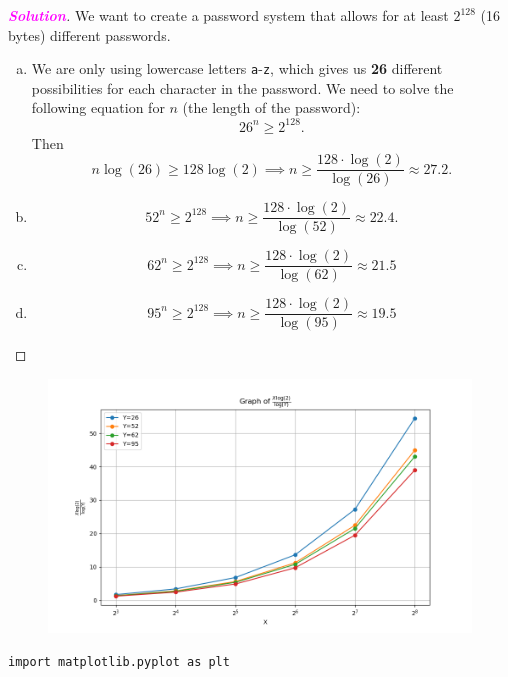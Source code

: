 \documentclass[12pt,openany]{book}
\theoremstyle{definition}
\newcommand{\sol}{\textcolor{magenta}{\bf Solution}}
\begin{document}
\begin{itemize}
\begin{enumerate}[(a)]
\begin{figure}[h!]
			\end{figure}
		\end{enumerate}
			\begin{proof}[\sol]
				We want to create a password system that allows for at least \(2^{128}\) (16 bytes) different passwords.
				\begin{enumerate}[(a)]
					\item We are only using lowercase letters \textcolor{red!70!black}{\texttt{a}}-\textcolor{red!70!black}{\texttt{z}}, which gives us \textbf{26} different possibilities for each character in the password. We need to solve the following equation for 
					\(n\) (the length of the password): \[
					26^n\geq 2^{128}.
					\] Then \[
					n\log(26)\geq 128\log(2)\implies n\geq\frac{128\cdot\log(2)}{\log(26)}\approx 27.2.
					\]
					\item \[
					52^n\geq 2^{128}\implies
					n\geq\frac{128\cdot\log(2)}{\log(52)}\approx 22.4.
					\]
					\item \[
					62^n\geq 2^{128}\implies n\geq\frac{128\cdot\log(2)}{\log(62)}\approx 21.5
					\]
					\item \[
					95^n\geq 2^{128}\implies n\geq\frac{128\cdot\log(2)}{\log(95)}\approx 19.5
					\]
				\end{enumerate}
			\end{proof}
		\begin{figure}[h!]
			\centering
			\includegraphics[scale=.75]{4_12.png}
		\end{figure}
		\begin{lstlisting}[style=sage]
import matplotlib.pyplot as plt


\end{lstlisting}
\end{itemize}
\end{document}
